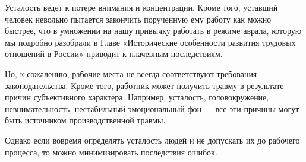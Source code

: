 \documentclass[12pt, letterpaper]{article}
\begin{document}
    Усталость ведет к потере внимания и концентрации.
    Кроме того, уставший человек невольно пытается закончить порученную ему работу как можно быстрее, что в умножении на нашу привычку работать в режиме аврала, которую мы подробно разобрали в Главе «Исторические особенности развития трудовых отношений в России» приводит к плачевным последствиям.

    Но, к сожалению, рабочие места не всегда соответствуют требования законодательства.
    Кроме того, работник может получить травму в результате причин субъективного характера.
    Например, усталость, головокружение, невнимательность, нестабильный эмоциональный фон — все эти причины могут быть источником производственной травмы.

    Однако если вовремя определять усталость людей и не допускать их до рабочего процесса, то можно минимизировать последствия ошибок.
\end{document}
